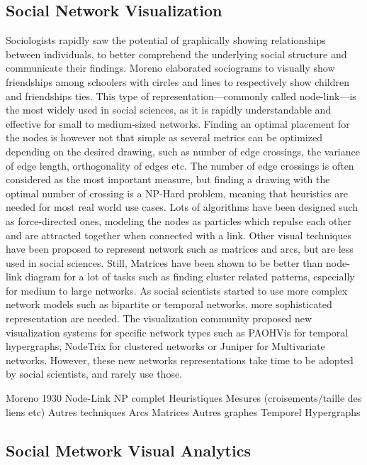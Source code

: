\subsection{Social Network Visualization}

Sociologists rapidly saw the potential of graphically showing relationships between individuals, to better comprehend the underlying social structure and communicate their findings.
Moreno elaborated sociograms to visually show friendships among schoolers with circles and lines to respectively show children and friendships ties.
This type of representation---commonly called node-link---is the most widely used in social sciences, as it is rapidly understandable and effective for small to medium-sized networks.
Finding an optimal placement for the nodes is however not that simple as several metrics can be optimized depending on the desired drawing, such as number of edge crossings, the variance of edge length, orthogonality of edges etc.
The number of edge crossings is often considered as the most important measure, but finding a drawing with the optimal number of crossing is a NP-Hard problem, meaning that heuristics are needed for most real world use cases.
Lots of algorithms have been designed such as force-directed ones, modeling the nodes as particles which repulse each other and are attracted together when connected with a link.
Other visual techniques have been proposed to represent network such as matrices and arcs, but are less used in social sciences.
Still, Matrices have been shown to be better than node-link diagram for a lot of tasks such as finding cluster related patterns, especially for medium to large networks.
As social scientists started to use more complex network models such as bipartite or temporal networks, more sophisticated representation are needed.
The visualization community proposed new visualization systems for specific network types such as PAOHVis for temporal hypergraphs, NodeTrix for clustered networks or Juniper for Multivariate networks.
However, these new networks representations take time to be adopted by social scientists, and rarely use those.



Moreno 1930
Node-Link
    NP complet
    Heuristiques
    Mesures (croisements/taille des liens etc)
Autres techniques
    Arcs
    Matrices
Autres graphes
    Temporel
    Hypergraphs


\subsection{Social Metwork Visual Analytics}

